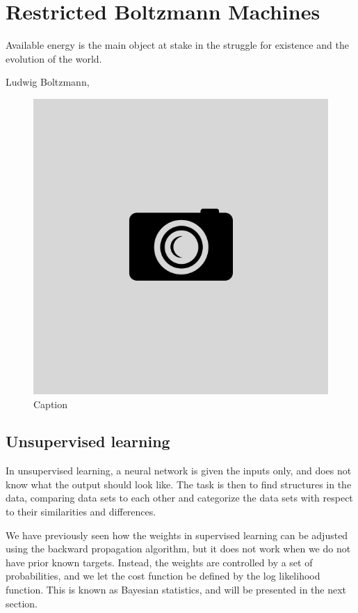 \chapter{Restricted Boltzmann Machines} \label{chp:restricted}
\epigraph{Available energy is the main object at stake in the struggle for existence and the evolution of the world.}{Ludwig Boltzmann, \cite{rajasekar_ludwig_2006}}
\begin{figure}[H]
	\centering
	\includegraphics[scale=0.25]{Images/example.png}
	\caption{Caption}
\end{figure}

\section{Unsupervised learning} \label{sec:unsupervised}
In unsupervised learning, a neural network is given the inputs only, and does not know what the output should look like. The task is then to find structures in the data, comparing data sets to each other and categorize the data sets with respect to their similarities and differences. 

We have previously seen how the weights in supervised learning can be adjusted using the backward propagation algorithm, but it does not work when we do not have prior known targets. Instead, the weights are controlled by a set of probabilities, and we let the cost function be defined by the log likelihood function. This is known as Bayesian statistics, and will be presented in the next section.

